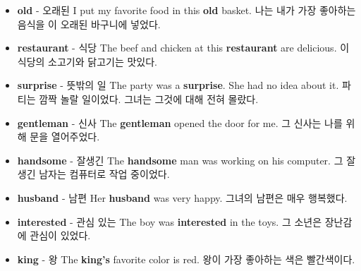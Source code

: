 \documentclass{article}
\begin{document}
\begin{addmargin}[1em]{1em}
\begin{itemize}
        \item \fontsize{12pt}{14pt}\selectfont \textbf{old} - 오래된 \newline
        I put my favorite food in this \textbf{old} basket. \newline
        나는 내가 가장 좋아하는 음식을 이 오래된 바구니에 넣었다.
        
        \item \fontsize{12pt}{14pt}\selectfont \textbf{restaurant} - 식당 \newline
        The beef and chicken at this \textbf{restaurant} are delicious. \newline
        이 식당의 소고기와 닭고기는 맛있다.
        
        \item \fontsize{12pt}{14pt}\selectfont \textbf{surprise} - 뜻밖의 일 \newline
        The party was a \textbf{surprise}. She had no idea about it. \newline
        파티는 깜짝 놀랄 일이었다. 그녀는 그것에 대해 전혀 몰랐다.
        
        \item \fontsize{12pt}{14pt}\selectfont \textbf{gentleman} - 신사 \newline
        The \textbf{gentleman} opened the door for me. \newline
        그 신사는 나를 위해 문을 열어주었다.
        
        \item \fontsize{12pt}{14pt}\selectfont \textbf{handsome} - 잘생긴 \newline
        The \textbf{handsome} man was working on his computer. \newline
        그 잘생긴 남자는 컴퓨터로 작업 중이었다.
        
        \item \fontsize{12pt}{14pt}\selectfont \textbf{husband} - 남편 \newline
        Her \textbf{husband} was very happy. \newline
        그녀의 남편은 매우 행복했다.
        
        \item \fontsize{12pt}{14pt}\selectfont \textbf{interested} - 관심 있는 \newline
        The boy was \textbf{interested} in the toys. \newline
        그 소년은 장난감에 관심이 있었다.
        
        \item \fontsize{12pt}{14pt}\selectfont \textbf{king} - 왕 \newline
        The \textbf{king's} favorite color is red. \newline
        왕이 가장 좋아하는 색은 빨간색이다.
        

\end{itemize}
\end{addmargin}
\end{document}
